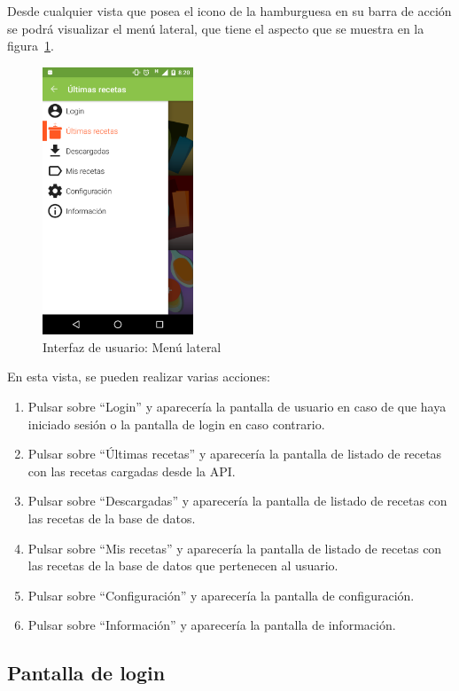 Desde cualquier vista que posea el icono de la hamburguesa en su barra de acción
se podrá visualizar el menú lateral, que tiene el aspecto que se muestra en la
figura~\ref{fig:captura_05}.

\begin{figure}[htbp]
  \centering
  \includegraphics[width=0.4\textwidth]{cap5/img/captura_05}
  \caption{Interfaz de usuario: Menú lateral}
  \label{fig:captura_05}
\end{figure}

En esta vista, se pueden realizar varias acciones:
\begin{enumerate}
\item Pulsar sobre ``Login'' y aparecería la pantalla de usuario en caso de que
  haya iniciado sesión o la pantalla de login en caso contrario.
\item Pulsar sobre ``Últimas recetas'' y aparecería la pantalla de listado de
  recetas con las recetas cargadas desde la API.
\item Pulsar sobre ``Descargadas'' y aparecería la pantalla de listado de
  recetas con las recetas de la base de datos.
\item Pulsar sobre ``Mis recetas'' y aparecería la pantalla de listado de
  recetas con las recetas de la base de datos que pertenecen al usuario.
\item Pulsar sobre ``Configuración'' y aparecería la pantalla de configuración.
\item Pulsar sobre ``Información'' y aparecería la pantalla de información.
\end{enumerate}


\subsection{Pantalla de login}

